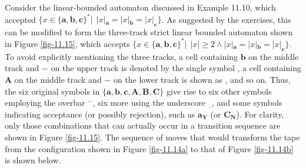 Consider the linear-bounded automaton discussed in Example 11.10, which
accepted $\{x\in\{\pmb{a},\pmb{b},\pmb{c}\}^*|\ \ |x|_{\pmb{a}}=|x|_{\pmb{b}} =
|x|_{\pmb{c}}\}$. As suggested by the exercises, this can be modified to form
the three-track strict linear bounded automaton shown in Figure \ref{fig-11.15}, which
accepts $\{x\in\{\pmb{a},\pmb{b},\pmb{c}\}^*|\ \ |x|\geq 2\wedge |x|_{\pmb{a}} =
|x|_{\pmb{b}} = |x|_{\pmb{c}}\}$. To avoid explicitly mentioning the three
tracks, a cell containing $\pmb{b}$ on the middle track and $-$ on the upper
track is denoted by the single symbol , a cell containing $\pmb{A}$ on
the middle track and $-$ on the lower track is shown as , and so on.
Thus, the six original symbols in $\{\pmb{a},\pmb{b},\pmb{c},\pmb{A},\pmb{B},
\pmb{C}\}$ give rise to six other symbols employing the overbar $^-$, six
more using the underscore $\underline{\ \ }$, and some symbols indicating
acceptance (or possibly rejection), such as $\pmb{a}_{\pmb{Y}}$ (or $\pmb{C}_{
\pmb{N}}$). For clarity, only those combinations that can actually occur in a
transition sequence are shown in Figure \ref{fig-11.15}. The sequence of moves that would
transform the tape from the configuration shown in Figure \ref{fig-11.14a} to that of
Figure \ref{fig-11.14b} is shown below.

